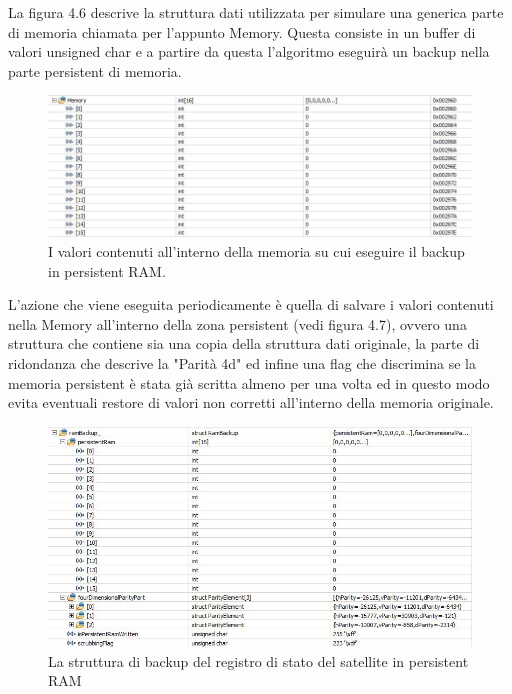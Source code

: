 \documentclass[LaM,binding=0.6cm]{../sapthesis}
\begin{document}
La figura 4.6 descrive la struttura dati utilizzata per simulare una generica parte di memoria chiamata per l'appunto Memory. Questa consiste in un buffer di valori unsigned char e a partire da questa l'algoritmo eseguirà un backup nella parte persistent di memoria.
\begin{figure}[htbp]
\centerline{\includegraphics[scale=0.6]{examples/1_MemoryNonCorrottaInizio.JPG}}
\caption{I valori contenuti all'interno della memoria su cui eseguire il backup in persistent RAM.}
\label{fig}
\end{figure}
\newline
L'azione che viene eseguita periodicamente è quella di salvare i valori contenuti nella Memory all'interno della zona persistent (vedi figura 4.7), ovvero una struttura che contiene sia una copia della struttura dati originale, la parte di ridondanza che descrive la "Parità 4d" ed infine una flag che discrimina se la memoria persistent è stata già scritta almeno per una volta ed in questo modo evita eventuali restore di valori non corretti all'interno della memoria originale.

\begin{figure}[htbp]
\centerline{\includegraphics[scale=0.6]{examples/2_PersistentRamBackup.JPG}}
\caption{La struttura di backup del registro di stato del satellite in persistent RAM}
\label{fig}
\end{figure}
\vspace{0.5cm}
\end{document}
